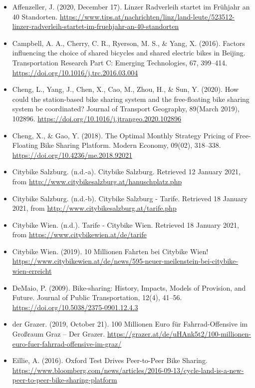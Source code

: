 \documentclass[
]{book}
\providecommand{\tightlist}{%
  \setlength{\itemsep}{0pt}\setlength{\parskip}{0pt}}
\begin{document}
\begin{itemize}
\tightlist
\item
  Affenzeller, J. (2020, December 17). Linzer Radverleih startet im Frühjahr an 40 Standorten. \url{https://www.tips.at/nachrichten/linz/land-leute/523512-linzer-radverleih-startet-im-fruehjahr-an-40-standorten}
\item
  Campbell, A. A., Cherry, C. R., Ryerson, M. S., \& Yang, X. (2016). Factors influencing the choice of shared bicycles and shared electric bikes in Beijing. Transportation Research Part C: Emerging Technologies, 67, 399--414. \url{https://doi.org/10.1016/j.trc.2016.03.004}
\item
  Cheng, L., Yang, J., Chen, X., Cao, M., Zhou, H., \& Sun, Y. (2020). How could the station-based bike sharing system and the free-floating bike sharing system be coordinated? Journal of Transport Geography, 89(March 2019), 102896. \url{https://doi.org/10.1016/j.jtrangeo.2020.102896}
\item
  Cheng, X., \& Gao, Y. (2018). The Optimal Monthly Strategy Pricing of Free-Floating Bike Sharing Platform. Modern Economy, 09(02), 318--338. \url{https://doi.org/10.4236/me.2018.92021}
\item
  Citybike Salzburg. (n.d.-a). Citybike Salzburg. Retrieved 12 January 2021, from \url{http://www.citybikesalzburg.at/hanuschplatz.php}
\item
  Citybike Salzburg. (n.d.-b). Citybike Salzburg - Tarife. Retrieved 18 January 2021, from \url{http://www.citybikesalzburg.at/tarife.php}
\item
  Citybike Wien. (n.d.). Tarife - Citybike Wien. Retrieved 18 January 2021, from \url{https://www.citybikewien.at/de/tarife}
\item
  Citybike Wien. (2019). 10 Millionen Fahrten bei Citybike Wien! \url{https://www.citybikewien.at/de/news/595-neuer-meilenstein-bei-citybike-wien-erreicht}
\item
  DeMaio, P. (2009). Bike-sharing: History, Impacts, Models of Provision, and Future. Journal of Public Transportation, 12(4), 41--56. \url{https://doi.org/10.5038/2375-0901.12.4.3}
\item
  der Grazer. (2019, October 21). 100 Millionen Euro für Fahrrad-Offensive im Großraum Graz -- Der Grazer. \url{https://grazer.at/de/uHAnk5t2/100-millionen-euro-fuer-fahrrad-offensive-im-graz/}
\item
  Eillie, A. (2016). Oxford Test Drives Peer-to-Peer Bike Sharing. \url{https://www.bloomberg.com/news/articles/2016-09-13/cycle-land-is-a-new-peer-to-peer-bike-sharing-platform}

\end{itemize}
\end{document}
